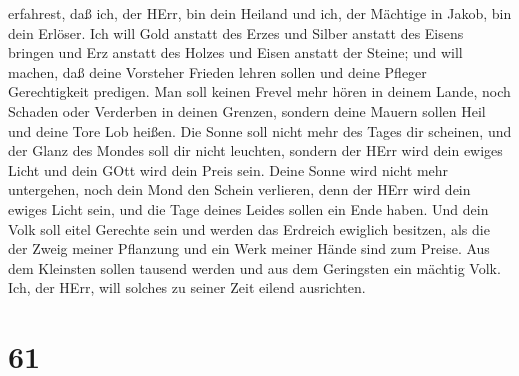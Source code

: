 erfahrest, daß ich, der HErr, bin dein Heiland und ich, der Mächtige in
Jakob, bin dein Erlöser.  Ich will Gold anstatt des Erzes
und Silber anstatt des Eisens bringen und Erz anstatt des Holzes und
Eisen anstatt der Steine; und will machen, daß deine Vorsteher Frieden
lehren sollen und deine Pfleger Gerechtigkeit predigen. 
Man soll keinen Frevel mehr hören in deinem Lande, noch Schaden oder
Verderben in deinen Grenzen, sondern deine Mauern sollen Heil und deine
Tore Lob heißen.  Die Sonne soll nicht mehr des Tages dir
scheinen, und der Glanz des Mondes soll dir nicht leuchten, sondern der
HErr wird dein ewiges Licht und dein GOtt wird dein Preis sein.
 Deine Sonne wird nicht mehr untergehen, noch dein Mond den
Schein verlieren, denn der HErr wird dein ewiges Licht sein, und die
Tage deines Leides sollen ein Ende haben.  Und dein Volk
soll eitel Gerechte sein und werden das Erdreich ewiglich besitzen, als
die der Zweig meiner Pflanzung und ein Werk meiner Hände sind zum
Preise.  Aus dem Kleinsten sollen tausend werden und aus
dem Geringsten ein mächtig Volk. Ich, der HErr, will solches zu seiner
Zeit eilend ausrichten.

\hypertarget{section-60}{%
\section{61}\label{section-60}}

